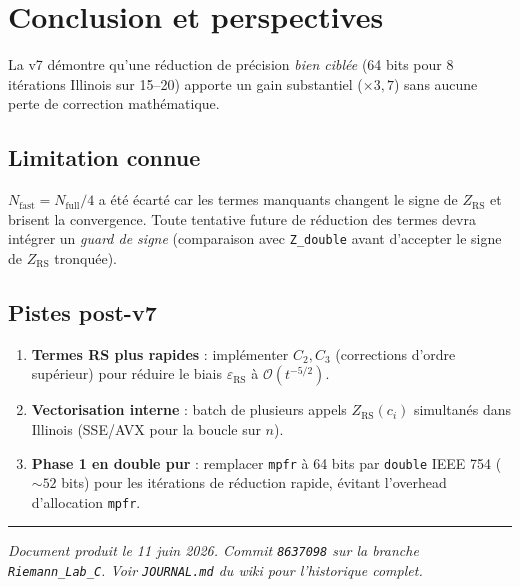\documentclass[11pt,a4paper]{article}
\begin{document}
\section{Conclusion et perspectives}

La v7 démontre qu'une réduction de précision \emph{bien ciblée} (64 bits pour 8
itérations Illinois sur 15--20) apporte un gain substantiel ($\times 3,7$) sans
aucune perte de correction mathématique.

\subsection*{Limitation connue}

$N_\text{fast} = N_\text{full}/4$ a été écarté car les termes manquants changent
le signe de $Z_\text{RS}$ et brisent la convergence.
Toute tentative future de réduction des termes devra intégrer un \emph{guard de signe}
(comparaison avec \texttt{Z\_double} avant d'accepter le signe de $Z_\text{RS}$ tronquée).

\subsection*{Pistes post-v7}

\begin{enumerate}
  \item \textbf{Termes RS plus rapides} : implémenter $C_2, C_3$ (corrections d'ordre
    supérieur) pour réduire le biais $\varepsilon_\text{RS}$ à $\mathcal{O}(t^{-5/2})$.
  \item \textbf{Vectorisation interne} : batch de plusieurs appels $Z_\text{RS}(c_i)$
    simultanés dans Illinois (SSE/AVX pour la boucle sur $n$).
  \item \textbf{Phase 1 en double pur} : remplacer \texttt{mpfr} à 64 bits par
    \texttt{double} IEEE 754 ($\sim 52$ bits) pour les itérations de réduction rapide,
    évitant l'overhead d'allocation \texttt{mpfr}.
\end{enumerate}

\vspace{1.5em}
\hrule
\vspace{0.5em}
\small\textit{Document produit le 11 juin 2026. Commit \texttt{8637098} sur la branche
\texttt{Riemann\_Lab\_C}. Voir \texttt{JOURNAL.md} du wiki pour l'historique complet.}
\end{document}
